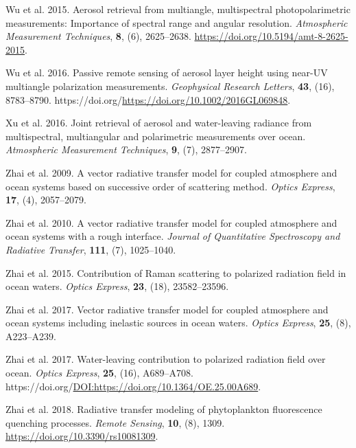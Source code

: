 \documentclass[
  11pt,
  letterpaper,
]{scrreprt}
\newlength{\cslhangindent}
\newenvironment{CSLReferences}[2] %
 {\begin{list}{}{%
  \setlength{\itemindent}{0pt}
  \setlength{\leftmargin}{0pt}
  \setlength{\parsep}{0pt}
  \ifodd #1
   \setlength{\leftmargin}{\cslhangindent}
   \setlength{\itemindent}{-1\cslhangindent}
  \fi
  \setlength{\itemsep}{#2\baselineskip}}}
 {\end{list}}
\begin{document}
\begin{CSLReferences}{1}{1}
Wu et al. 2015. Aerosol retrieval from multiangle, multispectral
photopolarimetric measurements: Importance of spectral range and angular
resolution. \emph{Atmospheric Measurement Techniques}, \textbf{8}, (6),
2625--2638. \url{https://doi.org/10.5194/amt-8-2625-2015}.

Wu et al. 2016. Passive remote sensing of aerosol layer height using
near-UV multiangle polarization measurements. \emph{Geophysical Research
Letters}, \textbf{43}, (16), 8783--8790.
https://doi.org/\url{https://doi.org/10.1002/2016GL069848}.

Xu et al. 2016. {Joint retrieval of aerosol and water-leaving radiance
from multispectral, multiangular and polarimetric measurements over
ocean}. \emph{Atmospheric Measurement Techniques}, \textbf{9}, (7),
2877--2907.

Zhai et al. 2009. {A vector radiative transfer model for coupled
atmosphere and ocean systems based on successive order of scattering
method}. \emph{Optics Express}, \textbf{17}, (4), 2057--2079.

Zhai et al. 2010. {A vector radiative transfer model for coupled
atmosphere and ocean systems with a rough interface}. \emph{Journal of
Quantitative Spectroscopy and Radiative Transfer}, \textbf{111}, (7),
1025--1040.

Zhai et al. 2015. {Contribution of Raman scattering to polarized
radiation field in ocean waters}. \emph{Optics Express}, \textbf{23},
(18), 23582--23596.

Zhai et al. 2017. {Vector radiative transfer model for coupled
atmosphere and ocean systems including inelastic sources in ocean
waters}. \emph{Optics Express}, \textbf{25}, (8), A223--A239.

Zhai et al. 2017. {Water-leaving contribution to polarized radiation
field over ocean}. \emph{Optics Express}, \textbf{25}, (16), A689--A708.
https://doi.org/\url{DOI:https://doi.org/10.1364/OE.25.00A689}.

Zhai et al. 2018. Radiative transfer modeling of phytoplankton
fluorescence quenching processes. \emph{Remote Sensing}, \textbf{10},
(8), 1309. \url{https://doi.org/10.3390/rs10081309}.


\end{CSLReferences}
\end{document}
